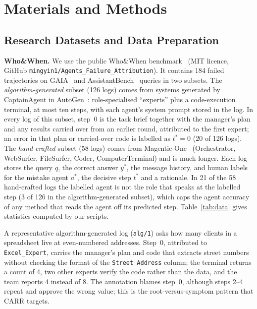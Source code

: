 \documentclass[conference]{IEEEtran}
\begin{document}
\section{Materials and Methods}\label{sec:method}
\subsection{Research Datasets and Data Preparation}
\textbf{Who\&When.} We use the public Who\&When benchmark~\cite{zhang2025whowhen} (MIT licence, GitHub \texttt{mingyin1/Agents\_Failure\_Attribution}). It contains 184 failed trajectories on GAIA~\cite{mialon2024gaia} and AssistantBench~\cite{yoran2024assistantbench} queries in two subsets. The \emph{algorithm-generated} subset (126 logs) comes from systems generated by CaptainAgent in AutoGen~\cite{wu2024autogen}: role-specialised ``experts'' plus a code-execution terminal, at most ten steps, with each agent's system prompt stored in the log. In every log of this subset, step~0 is the task brief together with the manager's plan and any results carried over from an earlier round, attributed to the first expert; an error in that plan or carried-over code is labelled as $t^*=0$ (20 of 126 logs). The \emph{hand-crafted} subset (58 logs) comes from Magentic-One~\cite{fourney2024magentic} (Orchestrator, WebSurfer, FileSurfer, Coder, ComputerTerminal) and is much longer. Each log stores the query $q$, the correct answer $y^*$, the message history, and human labels for the mistake agent $a^*$, the decisive step $t^*$ and a rationale. In 21 of the 58 hand-crafted logs the labelled agent is not the role that speaks at the labelled step (3 of 126 in the algorithm-generated subset), which caps the agent accuracy of any method that reads the agent off its predicted step. Table~\ref{tab:data} gives statistics computed by our scripts.

A representative algorithm-generated log (\texttt{alg/1}) asks how many clients in a spreadsheet live at even-numbered addresses. Step~0, attributed to \texttt{Excel\_Expert}, carries the manager's plan and code that extracts street numbers without checking the format of the \texttt{Street Address} column; the terminal returns a count of 4, two other experts verify the code rather than the data, and the team reports 4 instead of 8. The annotation blames step~0, although steps 2--4 repeat and approve the wrong value; this is the root-versus-symptom pattern that CARR targets.
\end{document}
